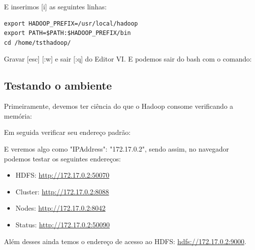 \documentclass[a4paper,11pt]{article}
\begin{document}
E inserimos [i] as seguintes linhas:
\begin{lstlisting}
export HADOOP_PREFIX=/usr/local/hadoop
export PATH=$PATH:$HADOOP_PREFIX/bin
cd /home/tsthadoop/
\end{lstlisting}

Gravar [esc] [:w] e sair [:q] do Editor VI. E podemos sair do bash com o comando: \\

\subsection{Testando o ambiente}
Primeiramente, devemos ter ciência do que o Hadoop consome verificando a memória: \\

Em seguida verificar seu endereço padrão: \\

E veremos algo como "IPAddress": "172.17.0.2", sendo assim, no navegador podemos testar os seguintes endereços: \vspace{-1em}
\begin{itemize}
	\item HDFS: \url{http://172.17.0.2:50070}
	\item Cluster: \url{http://172.17.0.2:8088}
	\item Nodes: \url{http://172.17.0.2:8042}
	\item Status: \url{http://172.17.0.2:50090}
\end{itemize}
Além desses ainda temos o endereço de acesso ao HDFS: \url{hdfs://172.17.0.2:9000}.
\end{document}
